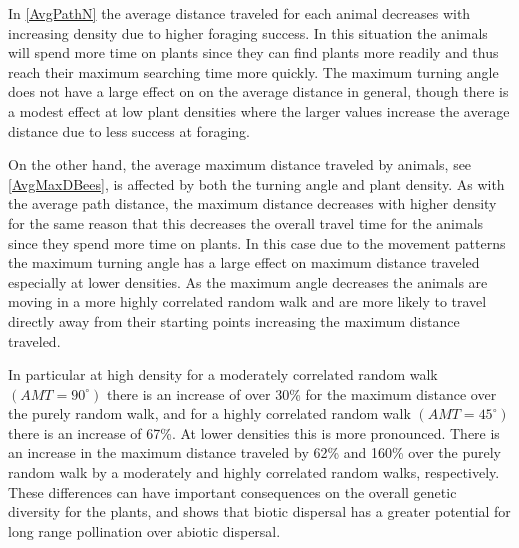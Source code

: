 In \autoref{AvgPathN} the average distance traveled for each animal decreases
with increasing density due to higher foraging success.  In this situation the
animals will spend more time on plants since they can find plants more readily
and thus reach their maximum searching time more quickly.  The maximum turning
angle does not have a large effect on on the  average distance in general,
though there is a modest effect at low plant densities where the larger values
increase the average distance due to less success at foraging.

On the other hand, the average maximum distance traveled by animals, see
\autoref{AvgMaxDBees}, is affected by both the turning angle and plant density.
As with the average path distance, the maximum distance decreases with higher
density for the same reason that this decreases the overall travel time for the
animals since they spend more time on plants.  In this case due to the movement
patterns the maximum turning angle has a large effect on maximum distance
traveled especially at lower densities.  As the maximum angle decreases the
animals are moving in a more highly correlated random walk and are more likely
to travel directly away from their starting points increasing the maximum
distance traveled.

In particular at high density for a moderately correlated random walk
$(AMT=90^{\circ})$ there is an increase of over 30\% for the maximum distance
over the purely random walk, and for a highly correlated random walk
$(AMT=45^{\circ})$ there is an increase of 67\%.  At lower densities this is
more pronounced.  There is an increase in the maximum distance traveled by 62\%
and 160\% over the purely random walk by a moderately and highly correlated
random walks, respectively. These differences can have important consequences on
the overall genetic diversity for the plants, and shows that biotic dispersal
has a greater potential for long range pollination over abiotic
dispersal.


